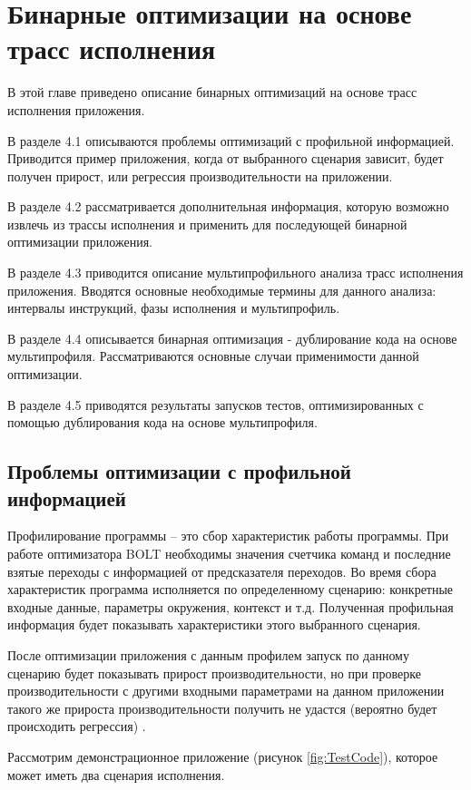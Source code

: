 \chapter{Бинарные оптимизации на основе трасс исполнения}\label{ch:ch4}

В этой главе приведено описание бинарных оптимизаций на основе трасс исполнения приложения.

В разделе 4.1 описываются проблемы оптимизаций с профильной информацией. Приводится пример приложения, когда от выбранного сценария зависит, будет получен прирост, или регрессия производительности на приложении.

В разделе 4.2 рассматривается дополнительная информация, которую возможно извлечь из трассы исполнения и применить для последующей бинарной оптимизации приложения.

В разделе 4.3 приводится описание мультипрофильного анализа трасс исполнения приложения. Вводятся основные необходимые термины для данного анализа: интервалы инструкций, фазы исполнения и мультипрофиль.

В разделе 4.4 описывается бинарная оптимизация - дублирование кода на основе мультипрофиля. Рассматриваются основные случаи применимости данной оптимизации.

В разделе 4.5 приводятся результаты запусков тестов, оптимизированных с помощью дублирования кода на основе мультипрофиля.

\section{Проблемы оптимизации с профильной информацией}\label{sec:ch4/sect1}
Профилирование программы – это сбор характеристик работы программы. При работе оптимизатора BOLT необходимы значения счетчика команд и последние взятые переходы с информацией от предсказателя переходов. Во время сбора характеристик программа исполняется по определенному сценарию: конкретные входные данные, параметры окружения, контекст и т.д. Полученная профильная информация будет показывать характеристики этого выбранного сценария.

После оптимизации приложения с данным профилем запуск по данному сценарию будет показывать прирост производительности, но при проверке производительности с другими входными параметрами на данном приложении такого же прироста производительности получить не удастся (вероятно будет происходить регрессия) \cite{Valiante2021}.

Рассмотрим демонстрационное приложение (рисунок \cref{fig:TestCode}), которое может иметь два сценария исполнения.

